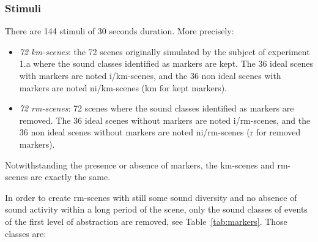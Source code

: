\documentclass[preprint,12pt]{elsarticle}
\newcommand{\ie}{\emph{i.\,e.}}
\newcommand{\cf}{cf.}
\begin{document}
\subsubsection*{Stimuli}


There are 144 stimuli of 30 seconds duration. More precisely:

\begin{itemize}
\item \emph{72 km-scenes}: the 72 scenes originally simulated by the subject of experiment 1.a where the sound classes identified as markers are kept. The 36 ideal scenes with markers are noted i/km-scenes, and the 36 non ideal scenes with markers are noted ni/km-scenes (km for kept markers).
\item \emph{72 rm-scenes}:  72 scenes where the sound classes identified as markers are removed. The 36 ideal scenes without markers are noted i/rm-scenes, and the 36 non ideal scenes without markers are noted ni/rm-scenes (r for removed markers).
\end{itemize}



Notwithstanding the presence or absence of markers, the km-scenes and rm-scenes are exactly the same.


In order to create rm-scenes with still some sound diversity and no  absence of sound activity within a long period of the scene, only the sound classes of events of the first level of abstraction are removed, see Table~\ref{tab:markers}. Those classes are:
\end{document}
